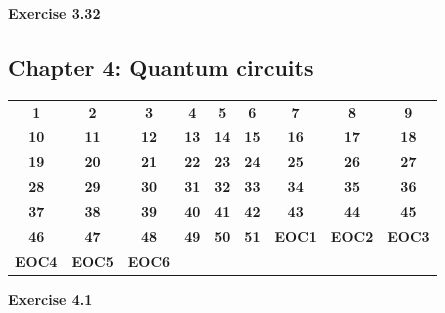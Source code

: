 \documentclass{article}
\newcommand{\solved}[1]{\colorbox{green!30}{\textbf{#1}}}
\newcommand{\notStarted}[1]{\colorbox{red!30}{\textbf{#1}}}
\begin{document}
\bigskip

\begin{framed}
    \noindent \textbf{Exercise 3.32}
    
    \medskip
    
    
\end{framed}

\subsection*{Chapter 4: Quantum circuits}

\begin{center}
\begin{tabular}{*{9}{c}}
\toprule
\notStarted{1} & \solved{2} & \solved{3} & \notStarted{4} & \notStarted{5} & \notStarted{6} & \notStarted{7} & \notStarted{8} & \notStarted{9} \\
\notStarted{10} & \notStarted{11} & \notStarted{12} & \notStarted{13} & \notStarted{14} & \notStarted{15} & \notStarted{16} & \notStarted{17} & \notStarted{18} \\
\notStarted{19} & \notStarted{20} & \notStarted{21} & \notStarted{22} & \notStarted{23} & \notStarted{24} & \notStarted{25} & \notStarted{26} & \notStarted{27} \\
\notStarted{28} & \notStarted{29} & \notStarted{30} & \notStarted{31} & \notStarted{32} & \notStarted{33} & \notStarted{34} & \notStarted{35} & \notStarted{36} \\
\notStarted{37} & \notStarted{38} & \notStarted{39} & \notStarted{40} & \notStarted{41} & \notStarted{42} & \notStarted{43} & \notStarted{44} & \notStarted{45} \\
\notStarted{46} & \notStarted{47} & \notStarted{48} & \notStarted{49} & \notStarted{50} & \notStarted{51} & \notStarted{EOC1} & \notStarted{EOC2} & \notStarted{EOC3} \\
\notStarted{EOC4} & \notStarted{EOC5} & \notStarted{EOC6} &  &  &  &  &  &  \\
\bottomrule
\end{tabular}
\end{center}


\bigskip

\begin{framed}
    \noindent \textbf{Exercise 4.1}
    
    \medskip
    
\end{framed}


\bigskip
\end{document}
